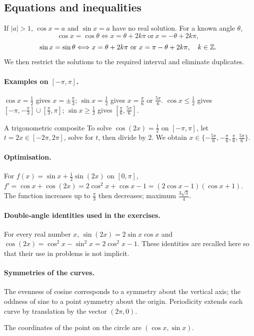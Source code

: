 \subsection{Equations and inequalities}
If $|a|>1$, $\cos x=a$ and $\sin x=a$ have no real solution. For a known angle $\theta$,
\[\cos x=\cos\theta\Longleftrightarrow x=\theta+2k\pi\ \text{or}\ x=-\theta+2k\pi,\]
\[\sin x=\sin\theta\Longleftrightarrow x=\theta+2k\pi\ \text{or}\ x=\pi-\theta+2k\pi,\quad k\in\mathbb Z.\]
We then restrict the solutions to the required interval and eliminate duplicates.
\paragraph{Examples on $[-\pi,\pi]$.} $\cos x=\frac{1}{2}$ gives $x=\pm\frac{\pi}{3}$; $\sin x=\frac{1}{2}$ gives $x=\frac{\pi}{6}$ or $\frac{5\pi}{6}$. $\cos x\le\frac{1}{2}$ gives $[-\pi,-\frac{\pi}{3}]\cup[\frac{\pi}{3},\pi]$; $\sin x\ge\frac{1}{2}$ gives $[\frac{\pi}{6},\frac{5\pi}{6}]$.
\begin{methode}{A trigonometric composite}
To solve $\cos (2x)=\frac{1}{2}$ on $[-\pi,\pi]$, let $t=2x\in[-2\pi,2\pi]$, solve for $t$, then divide by $2$. We obtain $x\in\{-\frac{5\pi}{6},-\frac{\pi}{6},\frac{\pi}{6},\frac{5\pi}{6}\}$.
\end{methode}
\paragraph{Optimisation.} For $f(x)=\sin x+\frac12\sin(2x)$ on $[0,\pi]$, $f'=\cos x+\cos(2x)=2\cos^2x+\cos x-1=(2\cos x-1)(\cos x+1)$. The function increases up to $\frac{\pi}{3}$ then decreases; maximum $\frac{3\sqrt{3}}{4}$.
\paragraph{Double-angle identities used in the exercises.} For every real number $x$, $\sin(2x)=2\sin x\cos x$ and $\cos(2x)=\cos^2x-\sin^2x=2\cos^2x-1$. These identities are recalled here so that their use in problems is not implicit.
\paragraph{Symmetries of the curves.} The evenness of cosine corresponds to a symmetry about the vertical axis; the oddness of sine to a point symmetry about the origin. Periodicity extends each curve by translation by the vector $(2\pi,0)$.


\begin{center}\par\small The coordinates of the point on the circle are $(\cos x,\sin x)$.\end{center}

